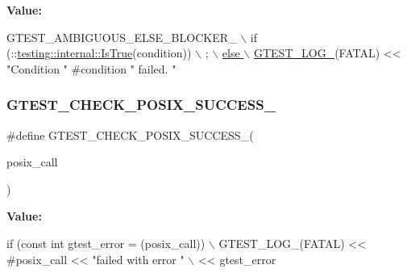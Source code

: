 {\bfseries Value\+:}
\begin{DoxyCode}
GTEST\_AMBIGUOUS\_ELSE\_BLOCKER\_ \(\backslash\)
    if (::\hyperlink{namespacetesting_1_1internal_a527b9bcc13669b9a16400c8514266254}{testing::internal::IsTrue}(condition)) \(\backslash\)
      ; \hyperlink{gtest-port_8h_a8ef4cb4c465db8c15464aecc6d9510ef}{\(\backslash\)}
\hyperlink{gtest-port_8h_a8ef4cb4c465db8c15464aecc6d9510ef}{    else \(\backslash\)}
\hyperlink{gtest-port_8h_a8ef4cb4c465db8c15464aecc6d9510ef}{      GTEST\_LOG\_}(FATAL) << \textcolor{stringliteral}{"Condition "} #condition \textcolor{stringliteral}{" failed. "}
\end{DoxyCode}
\mbox{\label{gtest-port_8h_a38f6151210e363ad7c69a836b13cf0af}} 
\subsubsection{\texorpdfstring{G\+T\+E\+S\+T\+\_\+\+C\+H\+E\+C\+K\+\_\+\+P\+O\+S\+I\+X\+\_\+\+S\+U\+C\+C\+E\+S\+S\+\_\+}{GTEST\_CHECK\_POSIX\_SUCCESS\_}}
{\footnotesize\ttfamily \#define G\+T\+E\+S\+T\+\_\+\+C\+H\+E\+C\+K\+\_\+\+P\+O\+S\+I\+X\+\_\+\+S\+U\+C\+C\+E\+S\+S\+\_\+(\begin{DoxyParamCaption}\item[{}]{posix\+\_\+call }\end{DoxyParamCaption})}

{\bfseries Value\+:}
\begin{DoxyCode}
\textcolor{keywordflow}{if} (\textcolor{keyword}{const} \textcolor{keywordtype}{int} gtest\_error = (posix\_call)) \(\backslash\)
    GTEST\_LOG\_(FATAL) << #posix\_call << \textcolor{stringliteral}{"failed with error "} \(\backslash\)
                      << gtest\_error
\end{DoxyCode}
\mbox{\label{gtest-port_8h_ae1f37dc71d5daa6fb49ca1b6047d4a8c}} 
